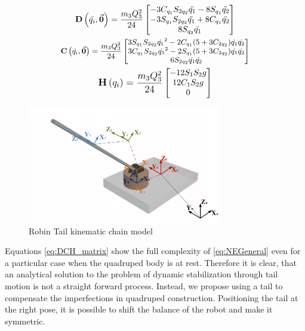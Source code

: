 \begin{gather}\label{eq:DCH_matrix}
\small
\mathbf{D}\left ( \ddot{q_i},\vec{\boldsymbol{0}} \right )=\frac{m_3 Q_3^2}{24}\begin{bmatrix}
-3C_{q_1}S_{2q_2}\ddot{q_1} -8S_{q_1}\ddot{q_2}\\ -3S_{q_1}S_{2q_2}\ddot{q_1} +8C_{q_1}\ddot{q_2} \\ 8S_{q_2}\ddot{q_1}
\end{bmatrix} \\
\footnotesize
\mathbf{C}\left ( \dot{q_i},\vec{\boldsymbol{0}} \right )=\frac{m_3 Q_3^2}{24} \begin{bmatrix}
3S_{q_1}S_{2q_2}{\dot{q_1}}^2-2C_{q_1}(5+3C_{2q_2})\dot{q_1}\dot{q_2}\\ 
3C_{q_1}S_{2q_2}{\dot{q_1}}^2-2S_{q_1}(5+3C_{2q_2})\dot{q_1}\dot{q_2}\\ 
6S_{2q_2}\dot{q_1}\dot{q_2}
\end{bmatrix}\\
\small
\mathbf{H}\left ( {q_i} \right )=\frac{m_3 Q_3^2}{24} \begin{bmatrix}
-12S_1S_2g\\ 
12C_1S_2g\\ 
0
\end{bmatrix}
\normalsize
\end{gather}

\begin{figure}
	\centering
	\includegraphics[width=85mm]{./pictures/RobinRepic.pdf}
	\caption{Robin Tail kinematic chain model}
	\label{fig:rmax}
\end{figure}

Equations \eqref{eq:DCH_matrix} show the full complexity of \eqref{eq:NEGeneral} even for a particular case when the quadruped body is at rest. Therefore it is clear, that an analytical solution to the problem of dynamic stabilization through tail motion is not a straight forward process. Instead, we propose using a tail to compensate the imperfections in quadruped construction. Positioning the tail at the right pose, it is possible to shift the balance of the robot and make it symmetric. 
